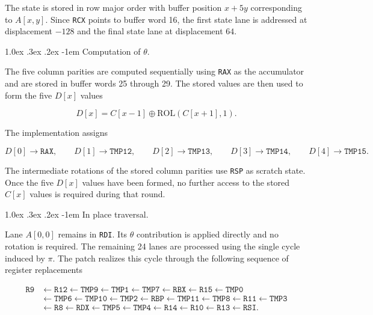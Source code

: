 \documentclass[journal=tches,submission]{iacrtrans}
\makeatletter
\renewcommand\paragraph{\@startsection{paragraph}{4}{\z@}%
      {1.0ex \@plus .3ex \@minus .2ex}%
      {-1em}%
      {\normalfont\normalsize\bfseries\SS@parafont}}
\makeatother
\begin{document}
The state is stored in row major order with buffer position $x+5y$ corresponding to $A[x,y]$.
Since \texttt{RCX} points to buffer word 16, the first state lane is addressed at displacement $-128$ and the final state lane at displacement $64$.

\paragraph{Computation of $\theta$.}

The five column parities are computed sequentially using \texttt{RAX} as the accumulator and are stored in buffer words 25 through 29.
The stored values are then used to form the five $D[x]$ values

$$
D[x] = C[x-1] \oplus \mathrm{ROL}(C[x+1],1).
$$

The implementation assigns

$$
D[0]\rightarrow\texttt{RAX},
\qquad
D[1]\rightarrow\texttt{TMP12},
\qquad
D[2]\rightarrow\texttt{TMP13},
\qquad
D[3]\rightarrow\texttt{TMP14},
\qquad
D[4]\rightarrow\texttt{TMP15}.
$$

The intermediate rotations of the stored column parities use \texttt{RSP} as scratch state.
Once the five $D[x]$ values have been formed, no further access to the stored $C[x]$ values is required during that round.

\paragraph{In place traversal.}

Lane $A[0,0]$ remains in \texttt{RDI}.
Its $\theta$ contribution is applied directly and no rotation is required.
The remaining 24 lanes are processed using the single cycle induced by $\pi$.
The patch realizes this cycle through the following sequence of register replacements

$$
\begin{aligned}
\texttt{R9} &\leftarrow \texttt{R12}
\leftarrow \texttt{TMP9}
\leftarrow \texttt{TMP1}
\leftarrow \texttt{TMP7}
\leftarrow \texttt{RBX}
\leftarrow \texttt{R15}
\leftarrow \texttt{TMP0} \\
&\leftarrow \texttt{TMP6}
\leftarrow \texttt{TMP10}
\leftarrow \texttt{TMP2}
\leftarrow \texttt{RBP}
\leftarrow \texttt{TMP11}
\leftarrow \texttt{TMP8}
\leftarrow \texttt{R11}
\leftarrow \texttt{TMP3} \\
&\leftarrow \texttt{R8}
\leftarrow \texttt{RDX}
\leftarrow \texttt{TMP5}
\leftarrow \texttt{TMP4}
\leftarrow \texttt{R14}
\leftarrow \texttt{R10}
\leftarrow \texttt{R13}
\leftarrow \texttt{RSI}.
\end{aligned}
$$
\end{document}
